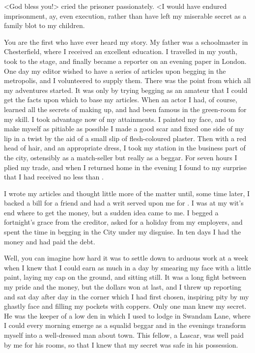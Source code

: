 <God bless you!> cried the prisoner passionately. <I would have endured imprisonment, ay, even execution, rather than have left my miserable secret as a family blot to my children.

You are the first who have ever heard my story. My father was a schoolmaster in Chesterfield, where I received an excellent education. I travelled in my youth, took to the stage, and finally became a reporter on an evening paper in London. One day my editor wished to have a series of articles upon begging in the metropolis, and I volunteered to supply them. There was the point from which all my adventures started. It was only by trying begging as an amateur that I could get the facts upon which to base my articles. When an actor I had, of course, learned all the secrets of making up, and had been famous in the green-room for my skill. I took advantage now of my attainments. I painted my face, and to make myself as pitiable as possible I made a good scar and fixed one side of my lip in a twist by the aid of a small slip of flesh-coloured plaster. Then with a red head of hair, and an appropriate dress, I took my station in the business part of the city, ostensibly as a match-seller but really as a beggar. For seven hours I plied my trade, and when I returned home in the evening I found to my surprise that I had received no less than .

I wrote my articles and thought little more of the matter until, some time later, I backed a bill for a friend and had a writ served upon me for . I was at my wit's end where to get the money, but a sudden idea came to me. I begged a fortnight's grace from the creditor, asked for a holiday from my employers, and spent the time in begging in the City under my disguise. In ten days I had the money and had paid the debt.

Well, you can imagine how hard it was to settle down to arduous work at  a week when I knew that I could earn as much in a day by smearing my face with a little paint, laying my cap on the ground, and sitting still. It was a long fight between my pride and the money, but the dollars won at last, and I threw up reporting and sat day after day in the corner which I had first chosen, inspiring pity by my ghastly face and filling my pockets with coppers. Only one man knew my secret. He was the keeper of a low den in which I used to lodge in Swandam Lane, where I could every morning emerge as a squalid beggar and in the evenings transform myself into a well-dressed man about town. This fellow, a Lascar, was well paid by me for his rooms, so that I knew that my secret was safe in his possession.

